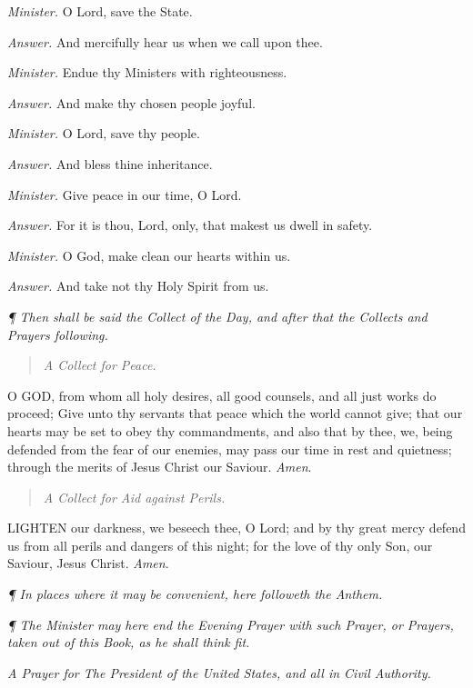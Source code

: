 \emph{Minister.} O Lord, save the
State.

\emph{Answer.} And
mercifully hear us when we call upon thee.

\emph{Minister.} Endue thy Ministers
with righteousness.

\emph{Answer.} And make thy chosen
people joyful.

\emph{Minister.} O Lord, save thy
people.

\emph{Answer.} And bless thine
inheritance.

\emph{Minister.} Give peace in our
time, O Lord.

\emph{Answer.} For
it is thou, Lord, only, that makest us dwell in safety.

\emph{Minister.} O God, make clean
our hearts within us.

\emph{Answer.} And take not thy
Holy Spirit from us.

\emph{¶
Then shall be said the Collect of the Day, and after that the Collects
and Prayers following.}

\begin{quote}

\emph{A
Collect for Peace.}

\end{quote}

O
GOD, from whom all holy desires, all good counsels, and all just works
do proceed; Give unto thy servants that peace which the world cannot give;
that our hearts may be set to obey thy commandments, and also that by
thee, we, being defended from the fear of our enemies, may pass our time
in rest and quietness; through the merits of Jesus Christ our Saviour.
\emph{Amen}.

\begin{quote}

\emph{A
Collect for Aid against Perils.}

\end{quote}

LIGHTEN
our darkness, we beseech thee, O Lord; and by thy great mercy defend us
from all perils and dangers of this night; for the love of thy only Son,
our Saviour, Jesus Christ. \emph{Amen}.

\emph{¶
In places where it may be convenient, here followeth the Anthem.}

\emph{¶
The Minister may here end the Evening Prayer with such Prayer, or Prayers,
taken out of this Book, as he shall think fit.}

\emph{A
Prayer for The President of the United States, and all in Civil Authority.}


